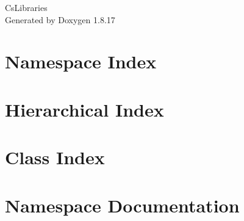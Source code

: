 \let\mypdfximage\pdfximage\def\pdfximage{\immediate\mypdfximage}\documentclass[twoside]{book}
\newcommand{\+}{\discretionary{\mbox{\scriptsize$\hookleftarrow$}}{}{}}
\newcommand{\clearemptydoublepage}{%
  \newpage{\pagestyle{empty}\cleardoublepage}%
}
\begin{document}
\begin{CJK}{UTF8}{min}

\hypersetup{pageanchor=false,
             bookmarksnumbered=true,
             pdfencoding=unicode
            }
\begin{titlepage}
\vspace*{7cm}
\begin{center}%
{\Large Cs\+Libraries }\\
\vspace*{1cm}
{\large Generated by Doxygen 1.8.17}\\
\end{center}
\end{titlepage}
\clearemptydoublepage
{}
\tableofcontents
\clearemptydoublepage
{}
\hypersetup{pageanchor=true}

\chapter{Namespace Index}

\chapter{Hierarchical Index}

\chapter{Class Index}

\chapter{Namespace Documentation}











\end{CJK}
\end{document}
